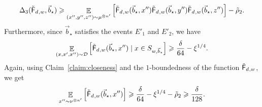 \documentclass[10pt,a4paper]{amsart}
\newcommand\Expect[2]{{\mathop{\mathbb{E}}_{#1}\left[ {#2} \right]}}
\renewcommand\geq{\geqslant}
\newcommand{\V}[1]{{#1}}
\begin{document}
\begin{equation}
    \label{eq:decoupled_move_to_uniform}
\Delta_3(\truncfcoarsedecoupled_{, \V w}, \vec{b}_\star) \geq  \Expect{(\V x'', \V y'', \V z'')\sim \mu^{\otimes n'}}{\truncfcoarsedecoupled_{,\V w}(\vec{b}_\star, \V x'') \truncfcoarsedecoupled_{,\V w}(\vec{b}_\star, \V y'') \truncfcoarsedecoupled_{,\V w}(\vec{b}_\star, \V z'')} - \tilde{\rho}_2.
\end{equation}
%
Furthermore, since $\vec{b}_\star$ satisfies the events $E'_1$ and $E'_2$, we have
$$\Expect{(\V x, \V x', \V x'')\sim \mathcal{D}}{\truncfcoarsedecoupled_{,\V w}(\vec{b}_\star,\V x'') \mid \V x\in S_{\V w, \vec{b}_\star} } \geq \frac{\delta}{64}  - \xi^{1/4} .$$
%
Again, using Claim~\ref{claim:closeness} and the  $1$-boundedness of the function $\truncfcoarsedecoupled_{,\V w}$, we get
\begin{equation}\label{eq:dense_F}
\Expect{\V x''\sim \nu^{\otimes n'}}{\truncfcoarsedecoupled_{,\V w}(\vec{b}_\star,\V x'')  } \geq \frac{\delta}{64}  - \xi^{1/4} - \tilde{\rho}_2\geq \frac{\delta}{128}.
\end{equation}
\end{document}
